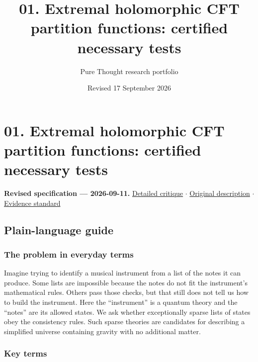 \documentclass[
  11pt,
]{article}
\title{01. Extremal holomorphic CFT partition functions: certified
necessary tests}
\author{Pure Thought research portfolio}
\date{Revised 17 September 2026}
\begin{document}
\maketitle
\thispagestyle{empty}
\clearpage

\section{01. Extremal holomorphic CFT partition functions: certified
necessary tests}

\textbf{Revised specification --- 2026-09-11.}
\href{https://github.com/rick-stevens-ai/Pure-Thought/blob/main/reviews/01-AdS3-Modular-Bootstrap.md}{Detailed
critique} \ensuremath{\cdot}
\href{https://github.com/rick-stevens-ai/Pure-Thought/blob/main/archive/original-PRDs/01-AdS3-Modular-Bootstrap.md}{Original
description} \ensuremath{\cdot}
\href{https://github.com/rick-stevens-ai/Pure-Thought/blob/main/reviews/EVIDENCE-STANDARD.md}{Evidence
standard}

\subsection{Plain-language guide}

\subsubsection{The problem in everyday terms}

Imagine trying to identify a musical instrument from a list of the notes
it can produce. Some lists are impossible because the notes do not fit
the instrument's mathematical rules. Others pass those checks, but that
still does not tell us how to build the instrument. Here the
``instrument'' is a quantum theory and the ``notes'' are its allowed
states. We ask whether exceptionally sparse lists of states obey the
consistency rules. Such sparse theories are candidates for describing a
simplified universe containing gravity with no additional matter.

\subsubsection{Key terms}
\end{document}
